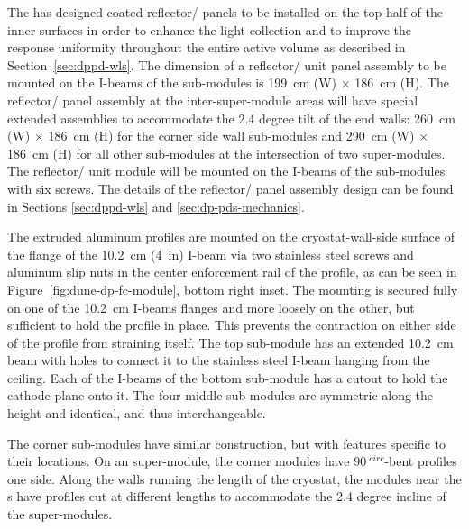 The \dual {} has designed  coated reflector/ panels to be installed on the top half of the  inner surfaces in order to enhance the light collection and to improve the  response uniformity throughout the entire %
active volume as described in Section~\ref{sec:dppd-wls}. The dimension of a reflector/ unit panel assembly to be mounted on the  I-beams of the  sub-modules is \SI{199}{\cm} (W) $\times$ \SI{186}{\cm} (H). The reflector/ panel assembly at the inter-super-module areas will have special extended assemblies to accommodate the \num{2.4} degree tilt of the end walls: 
 \SI{260}{\cm} (W) $\times$ \SI{186}{\cm} (H) for the corner side wall  sub-modules %
 and \SI{290}{\cm} (W) $\times$ \SI{186}{\cm} (H) for all other  sub-modules at the intersection of two  super-modules. The reflector/ unit module will be mounted on the  I-beams of the  sub-modules with six screws. The details of the reflector/ panel assembly design can be found in Sections \ref{sec:dppd-wls} and \ref{sec:dp-pds-mechanics}.

The extruded aluminum profiles are mounted on the cryostat-wall-side surface of the flange of the \SI{10.2}{\cm} (\SI{4}{in})  I-beam via two stainless steel screws and aluminum slip nuts in the center enforcement rail of the profile, as can be seen in  Figure~\ref{fig:dune-dp-fc-module}, bottom right inset. The mounting is secured fully  on one of the \SI{10.2}{\cm} I-beams flanges and more loosely on the other, but sufficient %
to hold the profile in place. This prevents the contraction on either side of the profile from straining itself. %
The top sub-module has an extended \SI{10.2}{\cm}  beam with holes to connect it to the stainless steel I-beam hanging from the ceiling. Each of the  I-beams of the bottom sub-module has a cutout to hold the cathode plane onto it. The four middle sub-modules are symmetric along the height and identical, and thus interchangeable.


The corner sub-modules have similar construction, but with features specific to their locations. On an \endwall super-module, the corner modules have $\SI{90}{^{circ}}$-bent profiles one side. Along the walls running the length of the cryostat, the modules near the \endwall{}s have profiles cut at different lengths to accommodate the \num{2.4} degree incline of the \endwall super-modules.

